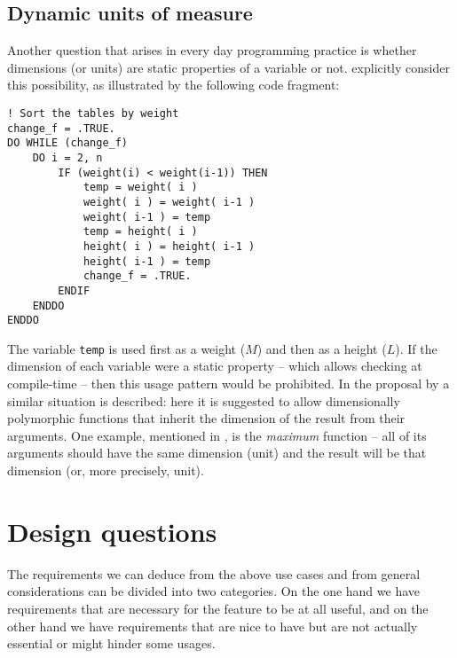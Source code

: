 \documentclass{article}
\begin{document}
\subsection{Dynamic units of measure}
Another question that arises in every day programming practice is whether dimensions (or units) are static properties
of a variable or not. \cite{SimconFPTSymbolLives} explicitly consider this possibility, as illustrated by the following
code fragment:

\begin{verbatim}
! Sort the tables by weight
change_f = .TRUE.
DO WHILE (change_f)
    DO i = 2, n
        IF (weight(i) < weight(i-1)) THEN
            temp = weight( i )
            weight( i ) = weight( i-1 )
            weight( i-1 ) = temp
            temp = height( i )
            height( i ) = height( i-1 )
            height( i-1 ) = temp
            change_f = .TRUE.
        ENDIF
    ENDDO
ENDDO
\end{verbatim}

The variable \verb+temp+ is used first as a weight ($M$) and then as a height ($L$). If the dimension of each variable were
a static property -- which allows checking at compile-time -- then this usage pattern would be prohibited. In the proposal
by \cite{PhysicalEngineeringUnitsN2113} a similar situation is described: here it is suggested to allow dimensionally polymorphic
functions that inherit the dimension of the result from their arguments. One example, mentioned in \cite{SimConFPTCheckingUnits},
is the \emph{maximum} function -- all of its arguments should have the same dimension (unit) and the result will be that dimension
(or, more precisely, unit).


\section{Design questions}
The requirements we can deduce from the above use cases and from general considerations can be divided
into two categories. On the one hand we have requirements that are necessary for the feature to be at all useful, and
on the other hand we have requirements that are nice to have but are not actually essential or might
hinder some usages.
\end{document}
